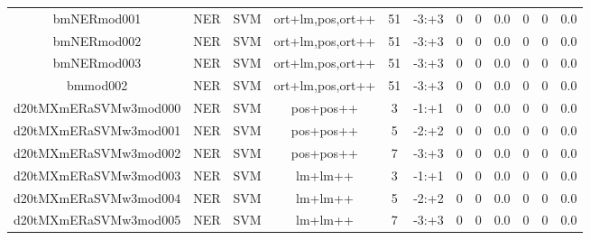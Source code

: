 \documentclass[a4paper]{article}
\begin{document}
\begin{landscape}
\begin{center}
\begin{tabular}{ |c|c|c|c|c|c|c|c|c|c|c|c|}
 
 	
 	\small{ bmNERmod001 } & \small{ NER} & \small{  SVM }  & ort+lm,pos,ort++  &  51 &  \small{  -3:+3 }  &  0 & 0 & 0.0  &  0 & 0 & 0.0 \\
 	

 
 	
 	\small{ bmNERmod002 } & \small{ NER} & \small{  SVM }  & ort+lm,pos,ort++  &  51 &  \small{  -3:+3 }  &  0 & 0 & 0.0  &  0 & 0 & 0.0 \\
 	

 
 	
 	\small{ bmNERmod003 } & \small{ NER} & \small{  SVM }  & ort+lm,pos,ort++  &  51 &  \small{  -3:+3 }  &  0 & 0 & 0.0  &  0 & 0 & 0.0 \\
 	

 
 	
 	\small{ bmmod002 } & \small{ NER} & \small{  SVM }  & ort+lm,pos,ort++  &  51 &  \small{  -3:+3 }  &  0 & 0 & 0.0  &  0 & 0 & 0.0 \\
 	

 
 	
 	\small{ d20tMXmERaSVMw3mod000 } & \small{ NER} & \small{  SVM }  & pos+pos++  &  3 &  \small{  -1:+1 }  &  0 & 0 & 0.0  &  0 & 0 & 0.0 \\
 	

 
 	
 	\small{ d20tMXmERaSVMw3mod001 } & \small{ NER} & \small{  SVM }  & pos+pos++  &  5 &  \small{  -2:+2 }  &  0 & 0 & 0.0  &  0 & 0 & 0.0 \\
 	

 
 	
 	\small{ d20tMXmERaSVMw3mod002 } & \small{ NER} & \small{  SVM }  & pos+pos++  &  7 &  \small{  -3:+3 }  &  0 & 0 & 0.0  &  0 & 0 & 0.0 \\
 	

 
 	
 	\small{ d20tMXmERaSVMw3mod003 } & \small{ NER} & \small{  SVM }  & lm+lm++  &  3 &  \small{  -1:+1 }  &  0 & 0 & 0.0  &  0 & 0 & 0.0 \\
 	

 
 	
 	\small{ d20tMXmERaSVMw3mod004 } & \small{ NER} & \small{  SVM }  & lm+lm++  &  5 &  \small{  -2:+2 }  &  0 & 0 & 0.0  &  0 & 0 & 0.0 \\
 	

 
 	
 	\small{ d20tMXmERaSVMw3mod005 } & \small{ NER} & \small{  SVM }  & lm+lm++  &  7 &  \small{  -3:+3 }  &  0 & 0 & 0.0  &  0 & 0 & 0.0 \\
 	


\end{tabular}
\end{center}
\end{landscape}
\end{document}
